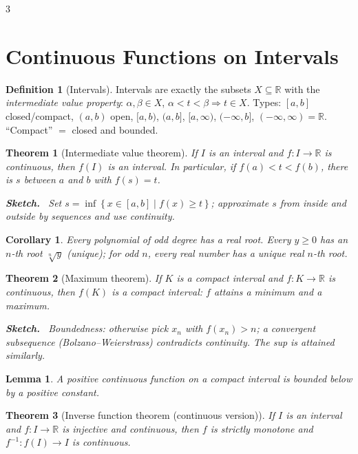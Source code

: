 \documentclass[10pt,a4paper,landscape]{article}
\theoremstyle{definition}
\newtheorem{defn}{Definition}[section]
\theoremstyle{plain}
\newtheorem{thm}{Theorem}[section]
\newtheorem{lem}{Lemma}[section]
\newtheorem{cor}{Corollary}[section]
\theoremstyle{remark}
\newcommand{\R}{\mathbb{R}}
\newcommand{\set}[1]{\left\{ #1 \right\}}
\newcommand{\oo}{\infty}
\newenvironment{proofsketch}{%
  \par\small\color{exgray}\textbf{Sketch.}\ }%
  {\par}
\begin{document}
\begin{multicols*}{3}
\section{Continuous Functions on Intervals}

\begin{defn}[Intervals]
Intervals are exactly the subsets $X \subseteq \R$ with the \emph{intermediate value property}: $\alpha, \beta \in X$, $\alpha < t < \beta \Rightarrow t \in X$. Types: $[a,b]$ closed/compact, $(a,b)$ open, $[a,b)$, $(a,b]$, $[a,\oo)$, $(-\oo,b]$, $(-\oo,\oo)=\R$. ``Compact'' $=$ closed and bounded.
\end{defn}

\begin{thm}[Intermediate value theorem]
If $I$ is an interval and $f: I \to \R$ is continuous, then $f(I)$ is an interval. In particular, if $f(a) < t < f(b)$, there is $s$ between $a$ and $b$ with $f(s) = t$.
\begin{proofsketch}
Set $s = \inf \set{x \in [a,b] \mid f(x) \ge t}$; approximate $s$ from inside and outside by sequences and use continuity.
\end{proofsketch}
\end{thm}

\begin{cor}
Every polynomial of odd degree has a real root. Every $y \ge 0$ has an $n$-th root $\sqrt[n]{y}$ (unique); for odd $n$, every real number has a unique real $n$-th root.
\end{cor}

\begin{thm}[Maximum theorem]
If $K$ is a compact interval and $f: K \to \R$ is continuous, then $f(K)$ is a compact interval: $f$ attains a minimum and a maximum.
\begin{proofsketch}
Boundedness: otherwise pick $x_n$ with $f(x_n) > n$; a convergent subsequence (Bolzano--Weierstrass) contradicts continuity. The sup is attained similarly.
\end{proofsketch}
\end{thm}

\begin{lem}
A positive continuous function on a compact interval is bounded below by a positive constant.
\end{lem}

\begin{thm}[Inverse function theorem (continuous version)]
If $I$ is an interval and $f: I \to \R$ is injective and continuous, then $f$ is strictly monotone and $f^{-1}: f(I) \to I$ is continuous.
\end{thm}


\end{multicols*}
\end{document}
